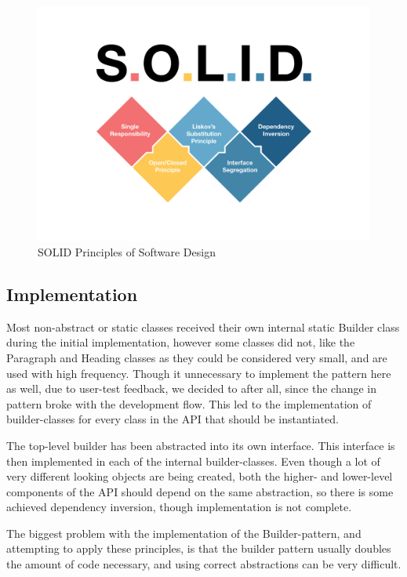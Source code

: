 \documentclass[12pt]{article}
\begin{document}
    \begin{figure}[H]
        \centering
        \includegraphics[scale=0.5]{images/solidGraphic.png}
        \caption{SOLID Principles of Software Design}
    \end{figure}

    \subsection{Implementation}

    Most non-abstract or static classes received their own internal static Builder class during the initial implementation, however some classes did not, like the Paragraph and Heading classes as they could be considered very small, and are used with high frequency. Though it unnecessary to implement the pattern here as well, due to user-test feedback, we decided to after all, since the change in pattern broke with the development flow. This led to the implementation of builder-classes for every class in the API that should be instantiated.
    
    The top-level builder has been abstracted into its own interface. This interface is then implemented in each of the internal builder-classes. Even though a lot of very different looking objects are being created, both the higher- and lower-level components of the API should depend on the same abstraction, so there is some achieved dependency inversion, though implementation is not complete.

    The biggest problem with the implementation of the Builder-pattern, and attempting to apply these principles, is that the builder pattern usually doubles the amount of code necessary, and using correct abstractions can be very difficult.
\end{document}

